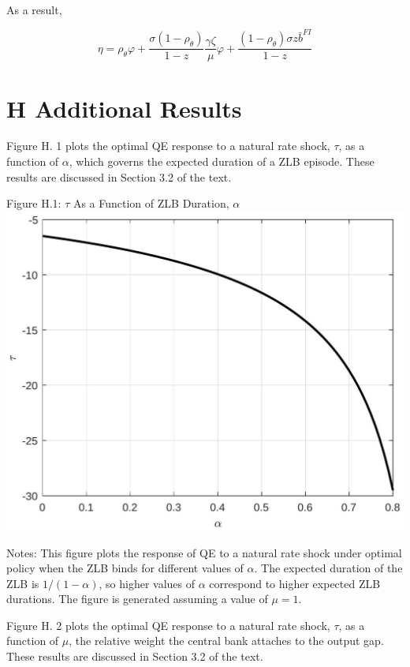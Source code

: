 \documentclass[10pt]{article}
\begin{document}
As a result,

\begin{equation*}
\eta=\rho_{\theta} \varphi+\frac{\sigma\left(1-\rho_{\theta}\right)}{1-z} \frac{\gamma \zeta}{\mu} \varphi+\frac{\left(1-\rho_{\theta}\right) \sigma z \bar{b}^{F I}}{1-z} \tag{G.36}
\end{equation*}

\section*{H Additional Results}
Figure H. 1 plots the optimal QE response to a natural rate shock, $\tau$, as a function of $\alpha$, which governs the expected duration of a ZLB episode. These results are discussed in Section 3.2 of the text.

Figure H.1: $\tau$ As a Function of ZLB Duration, $\alpha$\\
\includegraphics[max width=\textwidth, center]{2024_12_20_23d1456f4ac472ebd83dg-23}

Notes: This figure plots the response of QE to a natural rate shock under optimal policy when the ZLB binds for different values of $\alpha$. The expected duration of the ZLB is $1 /(1-\alpha)$, so higher values of $\alpha$ correspond to higher expected ZLB durations. The figure is generated assuming a value of $\mu=1$.

Figure H. 2 plots the optimal QE response to a natural rate shock, $\tau$, as a function of $\mu$, the relative weight the central bank attaches to the output gap. These results are discussed in Section 3.2 of the text.
\end{document}
